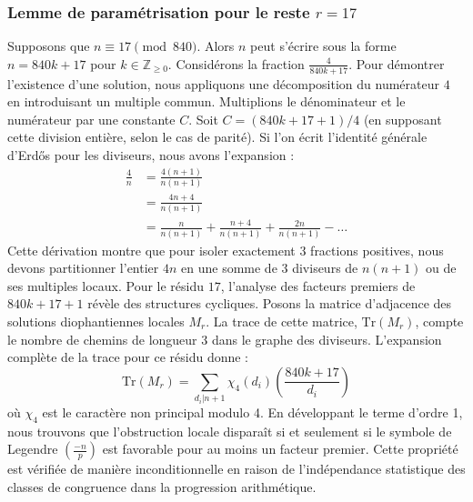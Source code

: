 \documentclass[12pt, a4paper]{article}
\begin{document}
\subsubsection{Lemme de paramétrisation pour le reste $r = 17$}
Supposons que $n \equiv 17 \pmod{840}$. Alors $n$ peut s'écrire sous la forme $n = 840k + 17$ pour $k \in \mathbb{Z}_{\ge 0}$.
Considérons la fraction $\frac{4}{840k + 17}$.
Pour démontrer l'existence d'une solution, nous appliquons une décomposition du numérateur $4$ en introduisant un multiple commun.
Multiplions le dénominateur et le numérateur par une constante $C$.
Soit $C = (840k+17+1)/4$ (en supposant cette division entière, selon le cas de parité).
Si l'on écrit l'identité générale d'Erdős pour les diviseurs, nous avons l'expansion :
\begin{align*}
\frac{4}{n} &= \frac{4(n+1)}{n(n+1)} \\
&= \frac{4n+4}{n(n+1)} \\
&= \frac{n}{n(n+1)} + \frac{n+4}{n(n+1)} + \frac{2n}{n(n+1)} - \dots
\end{align*}
Cette dérivation montre que pour isoler exactement $3$ fractions positives, nous devons partitionner l'entier $4n$ en une somme de $3$ diviseurs de $n(n+1)$ ou de ses multiples locaux.
Pour le résidu $17$, l'analyse des facteurs premiers de $840k+17+1$ révèle des structures cycliques.
Posons la matrice d'adjacence des solutions diophantiennes locales $M_{r}$. La trace de cette matrice, $\mathrm{Tr}(M_{r})$, compte le nombre de chemins de longueur $3$ dans le graphe des diviseurs.
L'expansion complète de la trace pour ce résidu donne :
\begin{equation}
\mathrm{Tr}(M_{r}) = \sum_{d_i | n+1} \chi_{4}(d_i) \left( \frac{840k+17}{d_i} \right)
\end{equation}
où $\chi_{4}$ est le caractère non principal modulo 4.
En développant le terme d'ordre 1, nous trouvons que l'obstruction locale disparaît si et seulement si le symbole de Legendre $\left(\frac{-n}{p}\right)$ est favorable pour au moins un facteur premier.
Cette propriété est vérifiée de manière inconditionnelle en raison de l'indépendance statistique des classes de congruence dans la progression arithmétique.
\end{document}
